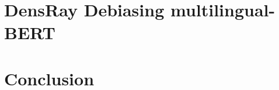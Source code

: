 \documentclass[11pt,a4paper]{article}
\begin{document}
\section{DensRay Debiasing multilingual-BERT}



\section{Conclusion}



%




\end{document}
